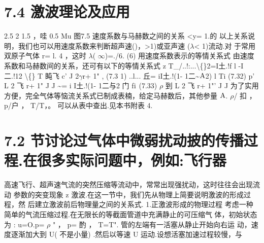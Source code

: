 \section*{7.4  激波理论及应用}

2.5 2 1.5 ，哇 0.5 Mu 图7.5 速度系数与马赫数之间的关系 <y= 1.的 以上关系说明，我们也可以用速度系数来判断超声速()，>1)或亚声速 ($\lambda$< 1)流动.对 于常用双原子气体 r= l. 4 ，这时 $\lambda$( $\infty$)=./6. (6) 用速度系数表示的等情关系式 由速度系数和马赫数间的关系，还可有以下的等情关系式 z T\_/..!:...\textbackslash\{\}2=I土.!f l -I二.!12 \textbackslash\{\} T 盹飞 c' J 2$\gamma$r+ 1" , (7.3 1) ..l... 丘= iI土.!(1- 1二\textasciitilde{}${\rm A}$2) l Ti (7.32) p' L 2 飞 r+ 1" J J \textasciitilde{}= i I土.!(1- 1二与2 门 f${\rm i}$ (7.33) $\rho$ 到 L 2 飞 r+ 1"' J J 为了实用方便，完全气体等恼流关系式已制成表楠，给定马赫数后，其他参量 ${\rm A}$. $\rho$/ 扣 ， p/户 ， T/T，。 可以从表中查出.见本书附表 4.

\section*{7.2  节讨论过气体中微弱扰动披的传播过程.在很多实际问题中，例如:飞行器}

高速飞行、超声速气流的突然压缩等流动中，常常出现强扰动，这时往往会出现流动 参数的突变现象 z 激波.在这一节中，我们先从物理上简要说明激波的形成过程，然 后建立激波前后物理量之间的关系式. 1.正激波形成的物理过程 考虑一种简单的气流压缩过程.在无限长的等截面管道中充满静止的可压缩气 体，初始状态为 : u=O.p= $\rho$ " ， p= 酌 ， T=T". 管的左端有一活塞从静止开始向右运 动，速度逐渐加大到 U( 不是小量) .然后以等速 U 运动.设想活塞加速过程较慢，与

